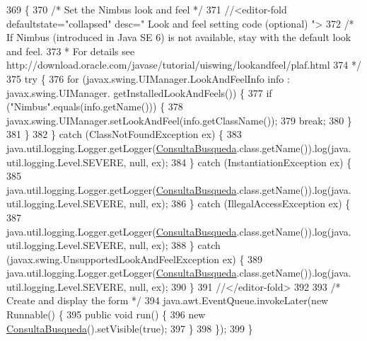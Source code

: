 \begin{DoxyCode}
369                                            \{
370         \textcolor{comment}{/* Set the Nimbus look and feel */}
371         \textcolor{comment}{//<editor-fold defaultstate="collapsed" desc=" Look and feel setting code (optional) ">}
372         \textcolor{comment}{/* If Nimbus (introduced in Java SE 6) is not available, stay with the default look and feel.}
373 \textcolor{comment}{         * For details see http://download.oracle.com/javase/tutorial/uiswing/lookandfeel/plaf.html }
374 \textcolor{comment}{         */}
375         \textcolor{keywordflow}{try} \{
376             \textcolor{keywordflow}{for} (javax.swing.UIManager.LookAndFeelInfo info : javax.swing.UIManager.
      getInstalledLookAndFeels()) \{
377                 \textcolor{keywordflow}{if} (\textcolor{stringliteral}{"Nimbus"}.equals(info.getName())) \{
378                     javax.swing.UIManager.setLookAndFeel(info.getClassName());
379                     \textcolor{keywordflow}{break};
380                 \}
381             \}
382         \} \textcolor{keywordflow}{catch} (ClassNotFoundException ex) \{
383             java.util.logging.Logger.getLogger(\mbox{\hyperlink{class_interfaz_package_1_1_consulta_busqueda_a0947d604c6fd72d808f32c4d3f9b2cc9}{ConsultaBusqueda}}.class.getName()).log(java.
      util.logging.Level.SEVERE, null, ex);
384         \} \textcolor{keywordflow}{catch} (InstantiationException ex) \{
385             java.util.logging.Logger.getLogger(\mbox{\hyperlink{class_interfaz_package_1_1_consulta_busqueda_a0947d604c6fd72d808f32c4d3f9b2cc9}{ConsultaBusqueda}}.class.getName()).log(java.
      util.logging.Level.SEVERE, null, ex);
386         \} \textcolor{keywordflow}{catch} (IllegalAccessException ex) \{
387             java.util.logging.Logger.getLogger(\mbox{\hyperlink{class_interfaz_package_1_1_consulta_busqueda_a0947d604c6fd72d808f32c4d3f9b2cc9}{ConsultaBusqueda}}.class.getName()).log(java.
      util.logging.Level.SEVERE, null, ex);
388         \} \textcolor{keywordflow}{catch} (javax.swing.UnsupportedLookAndFeelException ex) \{
389             java.util.logging.Logger.getLogger(\mbox{\hyperlink{class_interfaz_package_1_1_consulta_busqueda_a0947d604c6fd72d808f32c4d3f9b2cc9}{ConsultaBusqueda}}.class.getName()).log(java.
      util.logging.Level.SEVERE, null, ex);
390         \}
391         \textcolor{comment}{//</editor-fold>}
392 
393         \textcolor{comment}{/* Create and display the form */}
394         java.awt.EventQueue.invokeLater(\textcolor{keyword}{new} Runnable() \{
395             \textcolor{keyword}{public} \textcolor{keywordtype}{void} run() \{
396                 \textcolor{keyword}{new} \mbox{\hyperlink{class_interfaz_package_1_1_consulta_busqueda_a0947d604c6fd72d808f32c4d3f9b2cc9}{ConsultaBusqueda}}().setVisible(\textcolor{keyword}{true});
397             \}
398         \});
399     \}
\end{DoxyCode}


